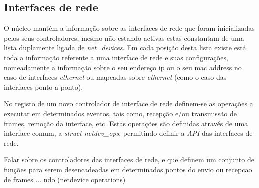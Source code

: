 % 
%						
%
% 

\subsection{Interfaces de rede}

O núcleo mantém a informação sobre as interfaces de rede que foram inicializadas pelos seus controladores, mesmo não estando activas estas constantam de uma lista duplamente ligada de \textit{net\_devices}. 
 Em cada posição desta lista existe está toda a informação referente a uma interface de rede e suas configurações, nomeadamente a informação sobre o seu endereço ip ou o seu mac address no caso de interfaces \textit{ethernet} ou mapeadas sobre \textit{ethernet} (como o caso das interfaces ponto-a-ponto).

No registo de um novo controlador de interface de rede definem-se as operações a executar em determinados eventos, tais como, recepção e/ou transmissão de frames, remoção da interface, etc.
 Estas operações são definidas através de uma interface comum, a \textit{struct netdev\_ops}, permitindo definir a \textit{API} das interfaces de rede.

 Falar sobre os controladores das interfaces de rede, e que definem um conjunto de funções para serem desencadeadas em determinados pontos do envio ou recepcao de frames ... ndo (netdevice operations) 
 
